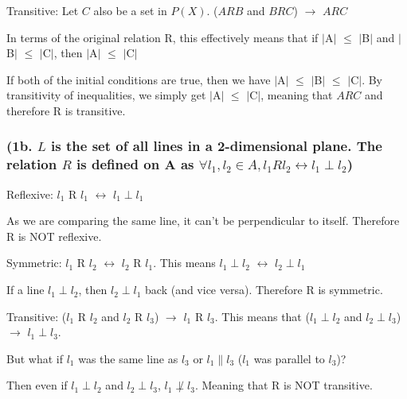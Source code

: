 \documentclass{article}
\begin{document}
\noindent Transitive: Let $C$ also be a set in $P(X)$.  ($ARB$ and $BRC$) $\rightarrow$ $ARC$ \par\noindent
In terms of the original relation R, this effectively means that if $\mid$A$\mid$ $\leq$ $\mid$B$\mid$ and $\mid$B$\mid$ $\leq$ $\mid$C$\mid$, then $\mid$A$\mid$ $\leq$ $\mid$C$\mid$ \par\noindent
If both of the initial conditions are true, then we have $\mid$A$\mid$ $\leq$ $\mid$B$\mid$ $\leq$ $\mid$C$\mid$.  By transitivity of inequalities, we simply get $\mid$A$\mid$ $\leq$ $\mid$C$\mid$, meaning that $ARC$ and therefore R is transitive.

\subsubsection{(1b. $L$ is the set of all lines in a 2-dimensional plane.  The relation $R$ is defined on A as $\forall l_{1}, l_{2} \in A, l_{1} R l_{2} \leftrightarrow l_{1} \perp l_{2}$)}

\noindent Reflexive: $l_{1}$ R $l_{1}$ $\leftrightarrow$ $l_{1} \perp l_{1}$ \par\noindent
As we are comparing the same line, it can't be perpendicular to itself.  Therefore R is NOT reflexive. \par\vspace{0.5cm}

\noindent Symmetric: $l_{1}$ R $l_{2}$ $\leftrightarrow$ $l_{2}$ R $l_{1}$.  This means $l_{1} \perp l_{2}$ $\leftrightarrow$ $l_{2} \perp l_{1}$  \par\noindent
If a line $l_{1} \perp l_{2}$, then $l_{2} \perp l_{1}$ back (and vice versa).  Therefore R is symmetric. \par\vspace{0.5cm}

\noindent Transitive: ($l_{1}$ R $l_{2}$ and $l_{2}$ R $l_{3}$) $\rightarrow$ $l_{1}$ R $l_{3}$.  This means that ($l_{1} \perp l_{2}$ and $l_{2} \perp l_{3}$) $\rightarrow$ $l_{1} \perp l_{3}$.\par\noindent
But what if $l_{1}$ was the same line as $l_{3}$ or $l_{1} \parallel l_{3}$ ($l_{1}$ was parallel to $l_{3}$)?\par\noindent

\noindent Then even if $l_{1} \perp l_{2}$ and $l_{2} \perp l_{3}$, $l_{1} \not\perp l_{3}$.  Meaning that R is NOT transitive. \par\vspace{1.5cm}
\end{document}
